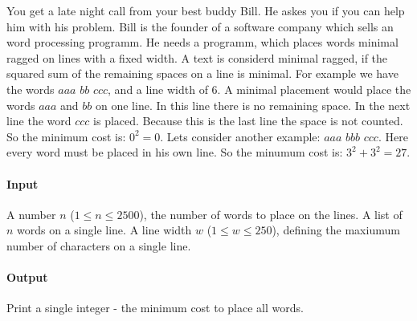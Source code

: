 



\makeheader

You get a late night call from your best buddy Bill. He askes you if you can help him with his problem.
Bill is the founder of a software company which sells an word processing programm. He needs a programm, which places words minimal ragged on lines with a fixed width.
A text is considerd minimal ragged, if the squared sum of the remaining spaces on a line is minimal.
For example we have the words $aaa$ $bb$ $ccc$, and a line width of 6.
A minimal placement would place the words $aaa$ and $bb$ on one line. In this line there is no remaining space.
In the next line the word $ccc$ is placed. Because this is the last line the space is not counted.
So the minimum cost is: $0^2 = 0$.
Lets consider another example: $aaa$ $bbb$ $ccc$. Here every word must be placed in his own line.
So the minumum cost is: $3^2+3^2= 27$.

\paragraph*{Input}
A number $n$ ($1 \leq n \leq 2500$), the number of words to place on the lines.
A list of $n$ words on a single line.
A line width $w$ ($1 \leq w \leq 250$), defining the maxiumum number of characters on a single line.

\paragraph*{Output}

Print a single integer - the minimum cost to place all words.

\begin{samples}
\end{samples}

